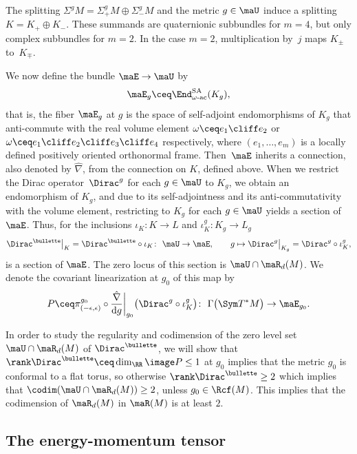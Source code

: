 The splitting $\Sigma^g M=\Sigma^g_+M\oplus \Sigma^g_-M$ and the metric $g\in \maU$ induce a splitting $K=K_+\oplus K_-$. These summands are quaternionic subbundles for $m=4$, but only complex subbundles for $m=2$. In the case $m=2$, multiplication by~$j$ maps $K_\pm$ to~$K_\mp$.

We now define the bundle $\maE \to \maU$ by
\[
\maE_g \ceq \End_{\omega\text{-ac}}^{\text{SA}} (K_g) ,
\]
that is, the fiber $\maE_g$ at $g$ is the space of self-adjoint endomorphisms of $K_g$ that anti-commute with the real volume element $\omega\ceq e_1\cliff e_2$ or $\omega\ceq e_1\cliff e_2\cliff e_3 \cliff e_4$ respectively, where $(e_1,\ldots,e_m)$ is a locally defined positively oriented orthonormal frame.
Then~$\maE$ inherits a connection, also denoted by $\hat\nabla$, from the connection on $K$, defined above.
When we restrict the Dirac operator~$\Dirac^g$ for each $g\in \maU$ to $K_g$, we obtain an endomorphism of $K_g$, and due to its self-adjointness and its anti-commutativity with the volume element, restricting to $K_g$ for each $g\in \maU$ yields a section of~$\maE$. Thus, for the inclusions $\iota_K\colon K\to L$ and $\iota_K^g\colon K_g\to L_g$
\[
\Dirac^{ \bullette}\big|_{K}=\Dirac^{ \bullette}\circ\iota_K\colon\ \maU \to \maE,
\qquad
g\mapsto \Dirac^g\big|_{K_g} = \Dirac^g\circ \iota_K^g,
\]
is a section of $\maE$. The zero locus of this section is $\maU\cap \maR_d(M)$. We denote the covariant linearization at $g_0$ of this map by
\begin{equation}\label{def.P}
P \ceq \pi_{(-\epsilon,\epsilon)}^{g_0} \circ\frac{\hat\nabla}{{\rm d}g}\bigg|_{g_0} \bigl(\Dirac^g \circ\iota_K^g\bigr)
\colon\ \Gamma \bigl(\Sym T^*M\bigr) \to \maE_{g_0} .
\end{equation}

In order to study the regularity and codimension of the zero level set $\maU\cap \maR_d(M)$ of
$\Dirac^{ \bullette}$, %
we will show that
$\rank \Dirac^{ \bullette} \ceq \dim_\RR \image P \leq 1$ %
at $g_0$ implies that the metric $g_0$ is conformal to a flat torus, so otherwise
$\rank \Dirac^{ \bullette} \geq 2$ %
which implies that $\codim (\maU\cap \maR_d(M)) \geq 2$, unless $g_0\in \Rcf(M)$.
This implies that the codimension of $\maR_d(M)$ in $\maR(M)$ is at least $2$.

\subsection{The energy-momentum tensor}

